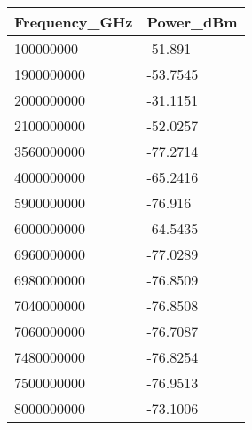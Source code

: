 \begin{tabular}{ll}
Frequency_GHz & Power_dBm \\ 
\hline 
100000000 & -51.891 \\ 
1900000000 & -53.7545 \\ 
2000000000 & -31.1151 \\ 
2100000000 & -52.0257 \\ 
3560000000 & -77.2714 \\ 
4000000000 & -65.2416 \\ 
5900000000 & -76.916 \\ 
6000000000 & -64.5435 \\ 
6960000000 & -77.0289 \\ 
6980000000 & -76.8509 \\ 
7040000000 & -76.8508 \\ 
7060000000 & -76.7087 \\ 
7480000000 & -76.8254 \\ 
7500000000 & -76.9513 \\ 
8000000000 & -73.1006 \\ 
\hline 
\end{tabular}